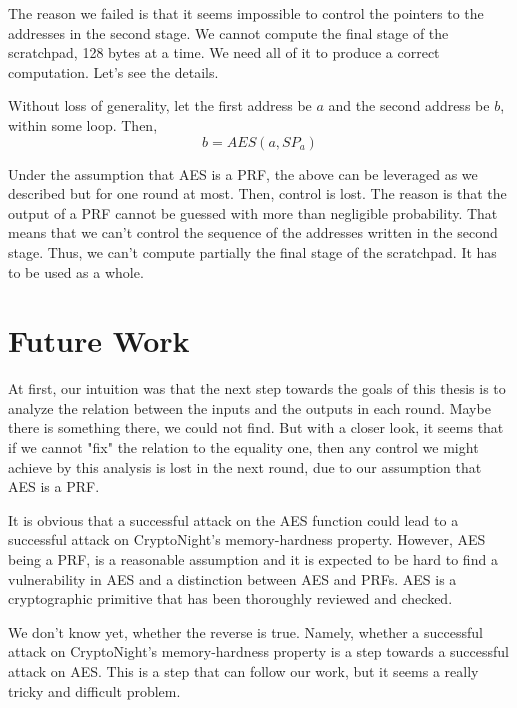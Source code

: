 The reason we failed is that it seems impossible to control the pointers to the addresses in the second stage. We cannot compute the final stage of the scratchpad, 128 bytes at a time. We need all of it to produce a correct computation. Let's see the details.

Without loss of generality, let the first address be $a$ and the second address be $b$, within some loop. Then,
\begin{equation} \nonumber
  b = AES(a,SP_a)
\end{equation}

Under the assumption that AES is a PRF, the above can be leveraged as we described but for one round at most. Then, control is lost. The reason is that the output of a PRF cannot be guessed with more than negligible probability. That means that we can't control the sequence of the addresses written in the second stage. Thus, we can't compute partially the final stage of the scratchpad. It has to be used as a whole.

\section{Future Work}
At first, our intuition was that the next step towards the goals of this thesis is to analyze the relation between the inputs and the outputs in each round. Maybe there is something there, we could not find. But with a closer look, it seems that if we cannot "fix" the relation to the equality one, then any control we might achieve by this analysis is lost in the next round, due to our assumption that AES is a PRF.

It is obvious that a successful attack on the AES function could lead to a successful attack on CryptoNight's memory-hardness property. However, AES being a PRF, is a reasonable assumption and it is expected to be hard to find a vulnerability in AES and a distinction between AES and PRFs. AES is a cryptographic primitive that has been thoroughly reviewed and checked.

We don't know yet, whether the reverse is true. Namely, whether a successful attack on CryptoNight's memory-hardness property is a step towards a successful attack on AES. This is a step that can follow our work, but it seems a really tricky and difficult problem.

